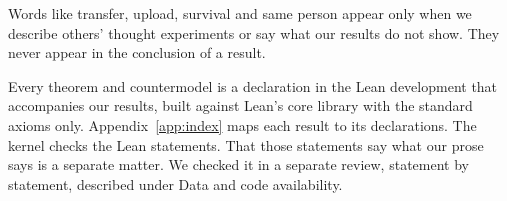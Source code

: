 Words like transfer, upload, survival and same person appear only when we
describe others' thought experiments or say what our results do not show.
They never appear in the conclusion of a result.

Every theorem and countermodel is a declaration in the Lean development
that accompanies our results, built against Lean's core library with the standard
axioms only. Appendix~\ref{app:index} maps each result to its declarations.
The kernel checks the Lean statements. That those statements say what our
prose says is a separate matter. We checked it in a separate review, statement
by statement, described under Data and code availability.
